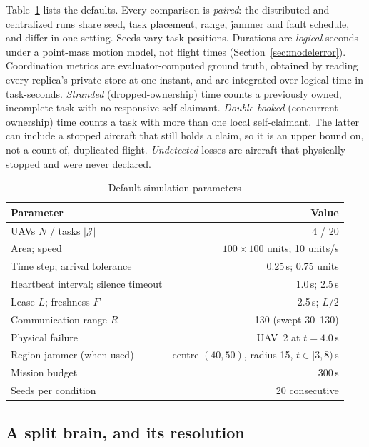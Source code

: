 \documentclass[conference]{IEEEtran}
\begin{document}
Table~\ref{tab:params} lists the defaults. Every comparison is \emph{paired}:
the distributed and centralized runs share seed, task placement, range,
jammer and fault schedule, and differ in one setting. Seeds vary task
positions. Durations are \emph{logical} seconds under a point-mass motion
model, not flight times (Section~\ref{sec:modelerror}). Coordination metrics
are evaluator-computed ground truth, obtained by reading every replica's
private store at one instant, and are integrated over logical time in
task-seconds. \emph{Stranded} (dropped-ownership) time counts a previously
owned, incomplete task with no responsive self-claimant. \emph{Double-booked}
(concurrent-ownership) time counts a task with more than one local
self-claimant. The latter can include a stopped aircraft that still holds a
claim, so it is an upper bound on, not a count of, duplicated flight.
\emph{Undetected} losses are aircraft that physically stopped and were never
declared.

\begin{table}[t]
\caption{Default simulation parameters}
\label{tab:params}
\centering
\footnotesize
\begin{tabular}{@{}lr@{}}
\toprule
Parameter & Value \\
\midrule
UAVs $N$ / tasks $|\mathcal{J}|$ & 4 / 20 \\
Area; speed & $100\times100$ units; 10 units/s \\
Time step; arrival tolerance & 0.25\,s; 0.75 units \\
Heartbeat interval; silence timeout & 1.0\,s; 2.5\,s \\
Lease $L$; freshness $F$ & 2.5\,s; $L/2$ \\
Communication range $R$ & 130 (swept 30--130) \\
Physical failure & UAV~2 at $t=4.0$\,s \\
Region jammer (when used) & centre $(40,50)$, radius 15, $t\in[3,8)$\,s \\
Mission budget & 300\,s \\
Seeds per condition & 20 consecutive \\
\bottomrule
\end{tabular}
\end{table}

\subsection{A split brain, and its resolution}
\label{sec:splitbrain}
\end{document}
